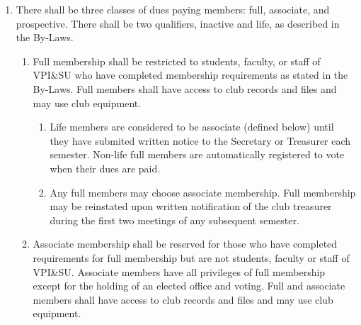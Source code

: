 \documentclass[
]{article}
\providecommand{\tightlist}{%
  \setlength{\itemsep}{0pt}\setlength{\parskip}{0pt}}
\begin{document}
\begin{enumerate}
\def\labelenumi{\arabic{enumi}.}
\tightlist
\item
  There shall be three classes of dues paying members: full, associate,
  and prospective. There shall be two qualifiers, inactive and life, as
  described in the By-Laws.

  \begin{enumerate}
  \def\labelenumii{\Alph{enumii}.}
  \tightlist
  \item
    Full membership shall be restricted to students, faculty, or staff
    of VPI\&SU who have completed membership requirements as stated in
    the By-Laws. Full members shall have access to club records and
    files and may use club equipment.

    \begin{enumerate}
    \def\labelenumiii{\roman{enumiii}.}
    \tightlist
    \item
      Life members are considered to be associate (defined below) until
      they have submited written notice to the Secretary or Treasurer
      each semester. Non-life full members are automatically registered
      to vote when their dues are paid.
    \item
      Any full members may choose associate membership. Full membership
      may be reinstated upon written notification of the club treasurer
      during the first two meetings of any subsequent semester.
    \end{enumerate}
  \item
    Associate membership shall be reserved for those who have completed
    requirements for full membership but are not students, faculty or
    staff of VPI\&SU. Associate members have all privileges of full
    membership except for the holding of an elected office and voting.
    Full and associate members shall have access to club records and
    files and may use club equipment.


\end{enumerate}
\end{enumerate}
\end{document}
